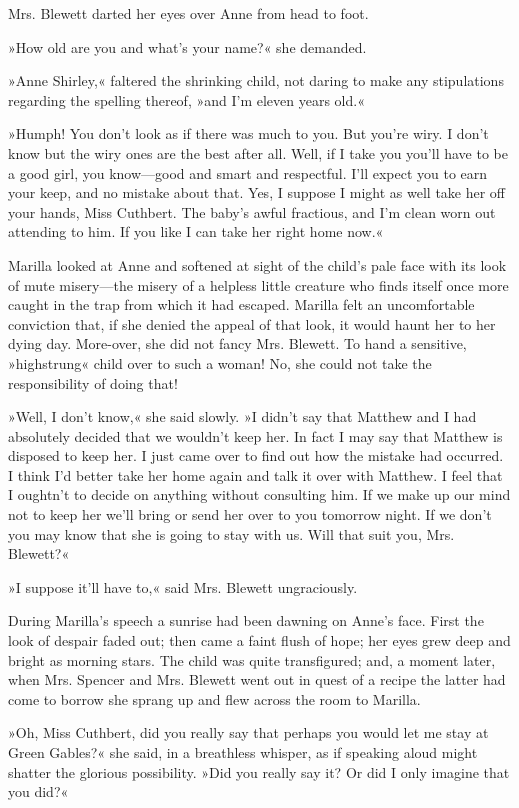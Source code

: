 Mrs. Blewett darted her eyes over Anne from head to foot.

»How old are you and what's your name?« she demanded.

»Anne Shirley,« faltered the shrinking child, not daring to make any stipulations regarding the spelling thereof, »and I'm eleven years old.«

»Humph! You don't look as if there was much to you. But you're wiry. I don't know but the wiry ones are the best after all. Well, if I take you you'll have to be a good girl, you know—good and smart and respectful. I'll expect you to earn your keep, and no mistake about that. Yes, I suppose I might as well take her off your hands, Miss Cuthbert. The baby's awful fractious, and I'm clean worn out attending to him. If you like I can take her right home now.«

Marilla looked at Anne and softened at sight of the child's pale face with its look of mute misery—the misery of a helpless little creature who finds itself once more caught in the trap from which it had escaped. Marilla felt an uncomfortable conviction that, if she denied the appeal of that look, it would haunt her to her dying day. More-over, she did not fancy Mrs. Blewett. To hand a sensitive, »highstrung« child over to such a woman! No, she could not take the responsibility of doing that!

»Well, I don't know,« she said slowly. »I didn't say that Matthew and I had absolutely decided that we wouldn't keep her. In fact I may say that Matthew is disposed to keep her. I just came over to find out how the mistake had occurred. I think I'd better take her home again and talk it over with Matthew. I feel that I oughtn't to decide on anything without consulting him. If we make up our mind not to keep her we'll bring or send her over to you tomorrow night. If we don't you may know that she is going to stay with us. Will that suit you, Mrs. Blewett?«

»I suppose it'll have to,« said Mrs. Blewett ungraciously.

During Marilla's speech a sunrise had been dawning on Anne's face. First the look of despair faded out; then came a faint flush of hope; her eyes grew deep and bright as morning stars. The child was quite transfigured; and, a moment later, when Mrs. Spencer and Mrs. Blewett went out in quest of a recipe the latter had come to borrow she sprang up and flew across the room to Marilla.

»Oh, Miss Cuthbert, did you really say that perhaps you would let me stay at Green Gables?« she said, in a breathless whisper, as if speaking aloud might shatter the glorious possibility. »Did you really say it? Or did I only imagine that you did?«

